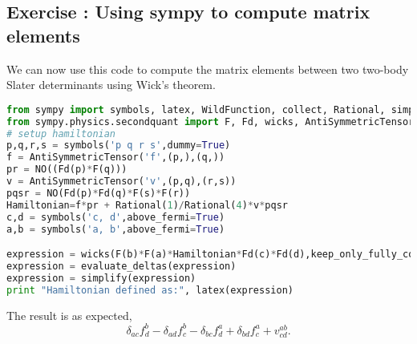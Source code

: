 \documentclass[graybox,sectrefs,envcountresetchap,open=right]{svmonodo}
\newenvironment{doconceexercise}{}{}
\newcounter{doconceexercisecounter}
\begin{document}
\begin{doconceexercise}

\subsection*{Exercise \thedoconceexercisecounter: Using sympy to compute matrix elements}


We can now use this code to compute the matrix elements between two two-body Slater determinants using Wick's theorem.
\begin{lstlisting}[language=Python,style=blue1bar]
from sympy import symbols, latex, WildFunction, collect, Rational, simplify
from sympy.physics.secondquant import F, Fd, wicks, AntiSymmetricTensor, substitute_dummies, NO, evaluate_deltas
# setup hamiltonian
p,q,r,s = symbols('p q r s',dummy=True)
f = AntiSymmetricTensor('f',(p,),(q,))
pr = NO((Fd(p)*F(q)))
v = AntiSymmetricTensor('v',(p,q),(r,s))
pqsr = NO(Fd(p)*Fd(q)*F(s)*F(r))
Hamiltonian=f*pr + Rational(1)/Rational(4)*v*pqsr
c,d = symbols('c, d',above_fermi=True)
a,b = symbols('a, b',above_fermi=True)

expression = wicks(F(b)*F(a)*Hamiltonian*Fd(c)*Fd(d),keep_only_fully_contracted=True, simplify_kronecker_deltas=True)
expression = evaluate_deltas(expression)
expression = simplify(expression)
print "Hamiltonian defined as:", latex(expression)
\end{lstlisting}
The result is as expected,
\[
\delta_{a c} f^{b}_{d} - \delta_{a d} f^{b}_{c} - \delta_{b c} f^{a}_{d} + \delta_{b d} f^{a}_{c} + v^{ab}_{cd}.
\]

\end{doconceexercise}
\end{document}
